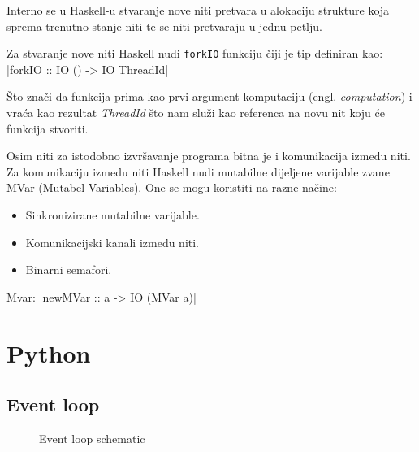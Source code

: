 Interno se u Haskell-u stvaranje nove niti pretvara u alokaciju strukture koja
sprema trenutno stanje niti te se niti pretvaraju u jednu petlju.

Za stvaranje nove niti Haskell nudi \texttt{forkIO} funkciju čiji
je tip definiran kao:
|forkIO :: IO () -> IO ThreadId|

Što znači da funkcija prima kao prvi argument komputaciju (engl.
\emph{computation}) i vraća kao rezultat \emph{ThreadId} što nam služi kao
referenca na novu nit koju će funkcija stvoriti.

Osim niti za istodobno izvršavanje programa bitna je i komunikacija između niti.
Za komunikaciju izmedu niti Haskell nudi mutabilne dijeljene varijable zvane
MVar (Mutabel Variables). One se mogu koristiti na razne načine:

\begin{itemize}
\item Sinkronizirane mutabilne varijable.
\item Komunikacijski kanali između niti.
\item Binarni semafori.
\end{itemize}

Mvar:
|newMVar :: a -> IO (MVar a)|


\newpage
\section{Python}
\subsection{Event loop}

\begin{figure}[h]
\centering
{}
\caption{Event loop schematic}
\end{figure}

